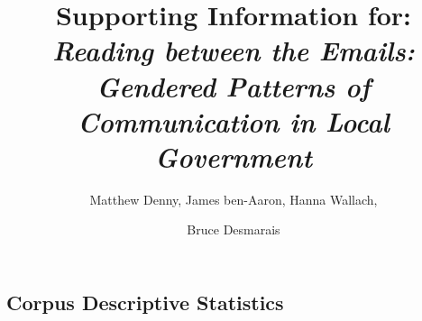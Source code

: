 \documentclass{pnastwo}
\begin{document}
\title{Supporting Information for: \emph{Reading between the Emails: Gendered Patterns of Communication in Local Government}}

\author{
Matthew Denny,
James ben-Aaron,
Hanna Wallach,
\and Bruce Desmarais
}

\contributor{\vspace{-.25cm}}


\maketitle

\begin{article}

\section{Corpus Descriptive Statistics}




\end{article}
\end{document}
